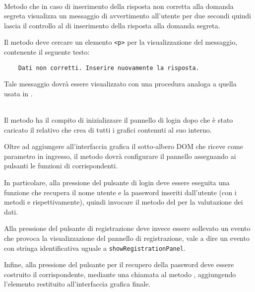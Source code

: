 \begin{description}
	\item{}\\
	Metodo che in caso di inserimento della risposta non corretta alla domanda segreta visualizza un messaggio di avvertimento all'utente per due secondi quindi lascia il controllo al  di inserimento della risposta alla domanda segreta.
	
	Il metodo deve cercare un elemento \verb'<p>' per la visualizzazione del messaggio, contenente il seguente testo:
\begin{verbatim}
	Dati non corretti. Inserire nuovamente la risposta.
\end{verbatim}
	
	Tale messaggio dovrà essere visualizzato con una procedura analoga a quella usata in .

	\item{}\\
	Il metodo ha il compito di inizializzare il pannello di login dopo che è stato caricato il relativo  che crea di tutti i  grafici contenuti al suo interno.
	
	Oltre ad aggiungere all'interfaccia grafica il sotto-albero DOM che riceve come parametro in ingresso, il metodo dovrà configurare il pannello assegnando ai pulsanti le funzioni di  corrispondenti.
	
	In particolare, alla pressione del pulsante di login deve essere eseguita una funzione che recupera il nome utente e la password inseriti dall'utente (con i metodi  e  rispettivamente), quindi invocare il metodo  del  per la valutazione dei dati.
	
	Alla pressione del pulsante di registrazione deve invece essere sollevato un evento che provoca la visualizzazione del pannello di registrazione, vale a dire un evento con stringa identificativa uguale a \verb'showRegistrationPanel'.
	
	Infine, alla pressione del pulsante per il recupero della password deve essere costruito il  corrispondente, mediante una chiamata al metodo , aggiungendo l'elemento restituito all'interfaccia grafica finale.
	

\end{description}
